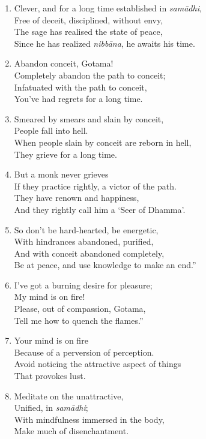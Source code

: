\documentclass[10pt, openany]{book}
\newcommand*{\vleftofline}[1]{\leavevmode\llap{#1}}
\begin{document}
\begin{enumerate}
\item Clever, and for a long time established in \emph{samādhi},\\
Free of deceit, disciplined, without envy,\\
The sage has realised the state of peace,\\
Since he has realized \emph{nibbāna}, he awaits his time.

\item Abandon conceit, Gotama!\\
Completely abandon the path to conceit;\\
Infatuated with the path to conceit,\\
You’ve had regrets for a long time.

\item Smeared by smears and slain by conceit,\\
People fall into hell.\\
When people slain by conceit are reborn in hell,\\
They grieve for a long time.

\item But a monk never grieves\\
If they practice rightly, a victor of the path.\\
They have renown and happiness,\\
And they rightly call him a ‘Seer of Dhamma’.

\item So don’t be hard-hearted, be energetic,\\
With hindrances abandoned, purified,\\
And with conceit abandoned completely,\\
Be at peace, and use knowledge to make an end.”

\item \vleftofline{“}I’ve got a burning desire for pleasure;\\
My mind is on fire!\\
Please, out of compassion, Gotama,\\
Tell me how to quench the flames.”

\item \vleftofline{“}Your mind is on fire\\
Because of a perversion of perception.\\
Avoid noticing the attractive aspect of things\\
That provokes lust.

\item Meditate on the unattractive,\\
Unified, in \emph{samādhi};\\
With mindfulness immersed in the body,\\
Make much of disenchantment.


\end{enumerate}
\end{document}
